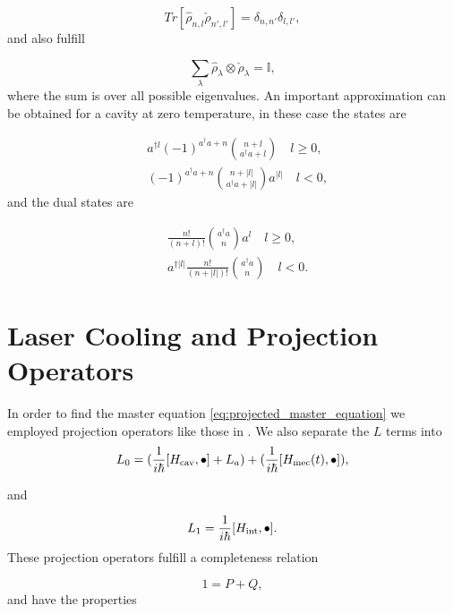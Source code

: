 \documentclass[reprint, amsmath,amssymb, aps,pra]{revtex4-1}
\begin{document}
\begin{equation}
Tr[\hat{\rho}_{n,l}\check{\rho}_{n',l'}] = \delta_{n,n'}\delta_{l,l'},
\end{equation} and also fulfill

\begin{equation}\label{DampingBasisCompleteness}
\sum_{\lambda} \hat{\rho}_\lambda \otimes \check{\rho}_\lambda = \mathbb{I},
\end{equation} where the sum is over all possible eigenvalues. An important approximation can be obtained for a cavity at zero temperature, in these case the states are \cite{EnglertDB}

\begin{align}\label{DefDBZero}
&a^{\dagger l}(-1)^{a^\dagger a + n}\binom{n+l}{a^\dagger a+l} \quad l \geq 0, \\
&(-1)^{a^\dagger a + n}\binom{n+|l|}{a^\dagger a+|l|}a^{|l|} \quad l < 0,
\end{align} and the dual states are

\begin{align}\label{DefDBDualZero}
&\frac{n!}{(n+l)!}\binom{a^\dagger a}{n}a^l \quad l \geq 0, \\
&a^{\dagger|l|}\frac{n!}{(n+|l|)!}\binom{a^\dagger a}{n} \quad l < 0.
\end{align}

\section{Laser Cooling and Projection Operators}\label{CoolingAppendix}

In order to find the master equation
\eqref{eq:projected_master_equation} we employed projection operators
like those in \cite{CarmichaelQO}. We also separate the $L$ terms into
\begin{equation}
L_0= (\frac{1}{i\hbar}[H_{\rm cav},\bullet]+L_a) +(\frac{1}{i\hbar}[H_{\rm mec}(t),\bullet]),
\end{equation}

and

\begin{equation}
L_1 = \frac{1}{i\hbar}[H_{\rm int},\bullet].
\end{equation}These projection operators fulfill a completeness
relation

\begin{equation}
1 = P + Q,
\end{equation} and have the properties
\end{document}
